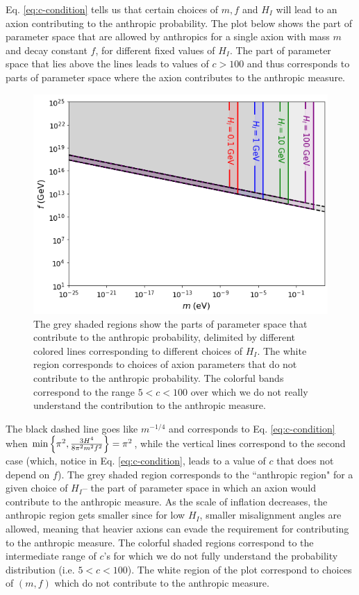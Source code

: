 \documentclass[11pt]{article}
\begin{document}
Eq. \eqref{eq:c-condition} tells us that certain choices of $m, f$ and $H_I$ will lead to an axion contributing to the anthropic probability. The plot below shows the part of parameter space that are allowed by anthropics for a single axion with mass $m$ and decay constant $f$, for different fixed values of $H_I$. The part of parameter space that lies above the lines leads to values of $c>100$ and thus corresponds to parts of parameter space where the axion contributes to the anthropic measure.

\begin{figure}[h]
    \includegraphics[scale=0.6]{figs/f-vs-m-anthropic.png}
    \centering
    \caption{The grey shaded regions show the parts of parameter space that contribute to the anthropic probability, delimited by different colored lines corresponding to different choices of $H_I$. The white region corresponds to choices of axion parameters that do not contribute to the anthropic probability. The colorful bands correspond to the range $5<c<100$ over which we do not really understand the contribution to the anthropic measure.}
    \label{fig:f-vs-a}
\end{figure}

The black dashed line goes like $m^{-1/4}$ and corresponds to Eq. \eqref{eq:c-condition} when $\min{ \Bigl\{ \pi^2,\frac{3H^4}{8\pi^2m^2f^2}\Bigr\}} = \pi^2$, while the vertical lines correspond to the second case (which, notice in Eq. \eqref{eq:c-condition}, leads to a value of $c$ that does not depend on $f$). The grey shaded region corresponds to the ``anthropic region" for a given choice of $H_I$– the part of parameter space in which an axion would contribute to the anthropic measure. As the scale of inflation decreases, the anthropic region gets smaller since for low $H_I$, smaller misalignment angles are allowed, meaning that heavier axions can evade the requirement for contributing to the anthropic measure. The colorful shaded regions correspond to the intermediate range of $c$'s for which we do not fully understand the probability distribution (i.e. $5<c<100$). The white region of the plot correspond to choices of $(m,f)$ which do not contribute to the anthropic measure.
\end{document}
